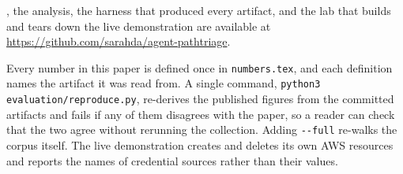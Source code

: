 \tool, the analysis, the harness that produced every artifact, and the lab
that builds and tears down the live demonstration are available at
\url{https://github.com/sarahda/agent-pathtriage}.

Every number in this paper is defined once in \texttt{numbers.tex}, and each
definition names the artifact it was read from. A single command,
\texttt{python3 evaluation/\allowbreak reproduce.py}, re-derives the published
figures from the committed artifacts and fails if any of them disagrees with
the paper, so a reader can check that the two agree without rerunning the
collection. Adding \texttt{-{}-full} re-walks the corpus itself. The live demonstration creates and deletes its own AWS
resources and reports the names of credential sources rather than their
values.

